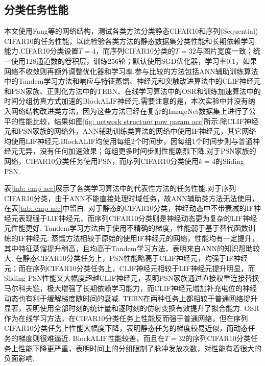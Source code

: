 \documentclass{SCIS2020cn}
\begin{document}
\subsection{分类任务性能}
本文使用Fang等\cite{fang2023parallel}的网络结构，测试各类方法分类静态CIFAR10和序列(Sequential) CIFAR10的任务性能，以此检验各类方法的静态数据集分类性能和长期依赖学习能力.CIFAR10分类设置$T=4$，而序列CIFAR10分类的$T=32$与图片宽度一致；统一使用128通道数的卷积层，训练256轮；默认使用SGD优化器，学习率0.1，如果网络不收敛则再额外调整优化器和学习率.参与比较的方法包括ANN辅助训练算法中的Tandem学习方法\cite{wu2021tandem}和响应与特征蒸馏\cite{xu2023constructing}、神经元和突触改进算法中的CLIF神经元\cite{huang2024clif}和PSN家族\cite{fang2023parallel}、正则化方法中的TEBN\cite{duan2022temporal}、在线学习算法中的OSR\cite{zhu2024online}和训练加速算法中的时间分组仿真方式加速的BlockALIF神经元\cite{NEURIPS2023_b9f253c2}.需要注意的是，本次实验中并没有纳入网络结构改进类方法，因为这些方法已经在复杂的ImageNet数据集上进行了公平的性能比较，结果如图\ref{fig: network structure pow param acc}所示.除CLIF神经元和PSN家族的网络外，ANN辅助训练类算法的网络中使用IF神经元，其它网络均使用LIF神经元.BlockALIF均使用每组2个时间步，因每组1个时间步则与普通神经元无异，没有任何加速效果；每组更多时间步则性能剧烈下降.对于PSN家族的网络，CIFAR10分类任务使用PSN，而序列CIFAR10分类使用$k=4$的Sliding PSN.%

表\ref{tab: cmp acc}展示了各类学习算法中的代表性方法的任务性能.对于序列CIFAR10分类，由于ANN不能直接处理时域任务，故ANN辅助类方法无法使用，在表\ref{tab: cmp acc}中留白.
对于静态的CIFAR10分类，神经动态中不带衰减的IF神经元表现强于LIF神经元，而序列CIFAR10分类则是神经动态更为复杂的LIF神经元性能更好.
Tandem学习方法由于使用不精确的梯度，性能弱于基于替代函数训练的IF神经元.
蒸馏方法相较于原始的使用IF神经元的网络，性能均有一定提升，其中特征蒸馏提升稍高，且均高于Tandem学习方法，表明来自ANN的知识帮助较大.
在静态CIFAR10分类任务上，PSN性能略高于CLIF神经元，均强于IF神经元；而在序列CIFAR10分类任务上，CLIF神经元相较于LIF神经元提升明显，而Sliding PSN性能又大幅度超越CLIF神经元，表明PSN家族通过直接权重连接替换马尔科夫链，极大增强了长期依赖学习能力，而CLIF神经元增加补充电位的神经动态也有利于缓解梯度随时间的衰减.
TEBN在两种任务上都相较于普通网络提升显著，表明使用全部时刻的统计量和逐时刻的仿射变换有效提升了拟合能力.
OSR作为在线学习方法，在CIFAR10分类任务上性能反而强于普通网络，但在序列CIFAR10分类任务上性能大幅度下降，表明静态任务的梯度较易近似，而动态任务的梯度则很难逼近.
BlockALIF性能较差，而且在$T=32$的序列CIFAR10分类任务上性能下降更严重，表明时间上的分组限制了脉冲发放次数，对性能有着很大的负面影响.
\end{document}
